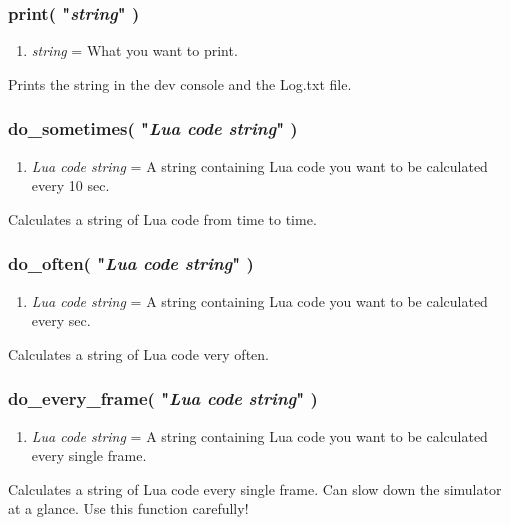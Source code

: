 \documentclass[11pt,parskip=half,a4paper]{scrartcl}
\begin{document}
\newpage
\subsubsection{print( "\emph{string}" )}

\begin{enumerate}
	\item \emph{string} = What you want to print.
\end{enumerate}

Prints the string in the dev console and the Log.txt file.

\subsubsection{do\_sometimes( "\emph{Lua code string}" )}

\begin{enumerate}
	\item \emph{Lua code string} = A string containing Lua code you want to be calculated every 10 sec.
\end{enumerate}

Calculates a string of Lua code from time to time.

\subsubsection{do\_often( "\emph{Lua code string}" )}

\begin{enumerate}
	\item \emph{Lua code string} = A string containing Lua code you want to be calculated every sec.
\end{enumerate}

Calculates a string of Lua code very often.

\subsubsection{do\_every\_frame( "\emph{Lua code string}" )}

\begin{enumerate}
	\item \emph{Lua code string} = A string containing Lua code you want to be calculated every single frame.
\end{enumerate}

Calculates a string of Lua code every single frame. Can slow down the simulator at a glance. Use this function carefully!
\end{document}
